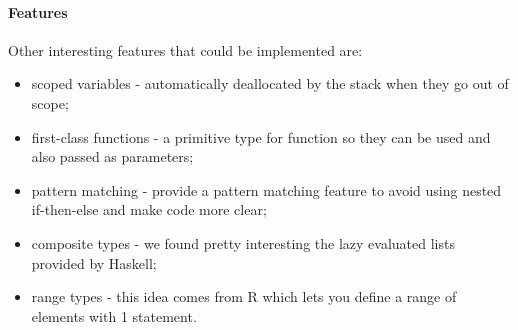 \paragraph{Features}
Other interesting features that could be implemented are:
\begin{itemize}
	\item scoped variables - automatically deallocated by the stack when they 
	go out of scope;
	\item first-class functions - a primitive type for function so they 
	can be used and also passed as parameters;
	\item pattern matching - provide a pattern matching feature to avoid using
	nested if-then-else and make code more clear;
	\item composite types - we found pretty interesting the lazy evaluated lists
	provided by Haskell;
	\item range types - this idea comes from R which lets you define a
	range of elements with 1 statement.
\end{itemize}